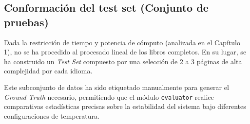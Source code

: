 \subsection{Conformación del test set (Conjunto de pruebas)}

Dada la restricción de tiempo y potencia de cómputo (analizada en el Capítulo 1), no se ha procedido al procesado lineal de los libros completos. En su lugar, se ha construido un \textit{Test Set} compuesto por una selección de 2 a 3 páginas de alta complejidad por cada idioma.

Este subconjunto de datos ha sido etiquetado manualmente para generar el \textit{Ground Truth} necesario, permitiendo que el módulo \texttt{evaluator} realice comparativas estadísticas precisas sobre la estabilidad del sistema bajo diferentes configuraciones de temperatura.
















